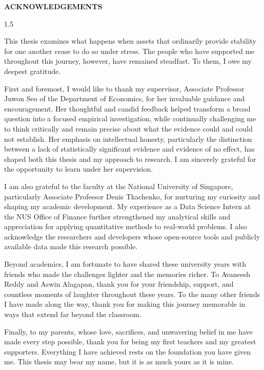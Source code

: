 \clearpage
\begin{center}\textbf{ACKNOWLEDGEMENTS}\end{center}
\begin{spacing}{1.5}

This thesis examines what happens when assets that ordinarily provide stability for one another cease to do so under stress. The people who have supported me throughout this journey, however, have remained steadfast. To them, I owe my deepest gratitude.

First and foremost, I would like to thank my supervisor, Associate Professor Juwon Seo of the Department of Economics, for her invaluable guidance and encouragement. Her thoughtful and candid feedback helped transform a broad question into a focused empirical investigation, while continually challenging me to think critically and remain precise about what the evidence could and could not establish. Her emphasis on intellectual honesty, particularly the distinction between a lack of statistically significant evidence and evidence of no effect, has shaped both this thesis and my approach to research. I am sincerely grateful for the opportunity to learn under her supervision.

I am also grateful to the faculty at the National University of Singapore, particularly Associate Professor Denis Tkachenko, for nurturing my curiosity and shaping my academic development. My experience as a Data Science Intern at the NUS Office of Finance further strengthened my analytical skills and appreciation for applying quantitative methods to real-world problems. I also acknowledge the researchers and developers whose open-source tools and publicly available data made this research possible.

Beyond academics, I am fortunate to have shared these university years with friends who made the challenges lighter and the memories richer. To Avaneesh Reddy and Aswin Alagapan, thank you for your friendship, support, and countless moments of laughter throughout these years. To the many other friends I have made along the way, thank you for making this journey memorable in ways that extend far beyond the classroom.

Finally, to my parents, whose love, sacrifices, and unwavering belief in me have made every step possible, thank you for being my first teachers and my greatest supporters. Everything I have achieved rests on the foundation you have given me. This thesis may bear my name, but it is as much yours as it is mine.
\end{spacing}
\clearpage

